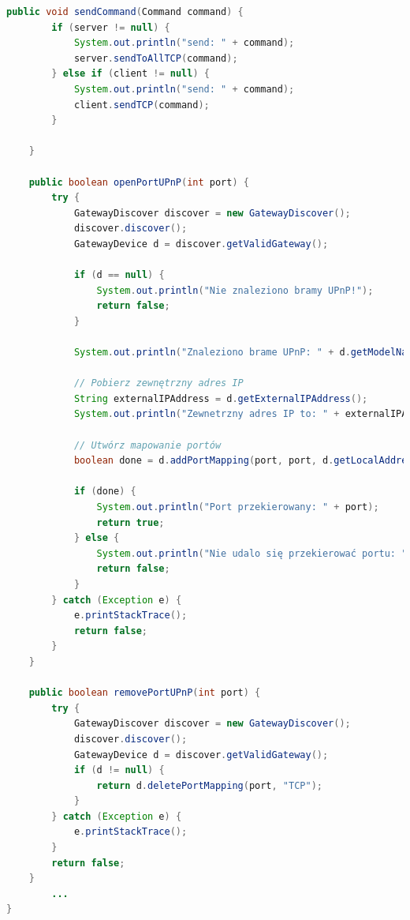 \begin{lstlisting}[language=Java,style=JavaStyle,label=list:multiplayer,caption=Klasa \texttt{Multiplayer},
                   basicstyle=\footnotesize\ttfamily]
    public void sendCommand(Command command) {
        if (server != null) {
            System.out.println("send: " + command);
            server.sendToAllTCP(command);
        } else if (client != null) {
            System.out.println("send: " + command);
            client.sendTCP(command);
        }

    }

    public boolean openPortUPnP(int port) {
        try {
            GatewayDiscover discover = new GatewayDiscover();
            discover.discover();
            GatewayDevice d = discover.getValidGateway();

            if (d == null) {
                System.out.println("Nie znaleziono bramy UPnP!");
                return false;
            }

            System.out.println("Znaleziono brame UPnP: " + d.getModelName());

            // Pobierz zewnętrzny adres IP
            String externalIPAddress = d.getExternalIPAddress();
            System.out.println("Zewnetrzny adres IP to: " + externalIPAddress);

            // Utwórz mapowanie portów
            boolean done = d.addPortMapping(port, port, d.getLocalAddress().getHostAddress(), "TCP", "KryoNet Game Server");

            if (done) {
                System.out.println("Port przekierowany: " + port);
                return true;
            } else {
                System.out.println("Nie udalo się przekierować portu: " + port);
                return false;
            }
        } catch (Exception e) {
            e.printStackTrace();
            return false;
        }
    }

    public boolean removePortUPnP(int port) {
        try {
            GatewayDiscover discover = new GatewayDiscover();
            discover.discover();
            GatewayDevice d = discover.getValidGateway();
            if (d != null) {
                return d.deletePortMapping(port, "TCP");
            }
        } catch (Exception e) {
            e.printStackTrace();
        }
        return false;
    }
		...
}
									
\end{lstlisting}